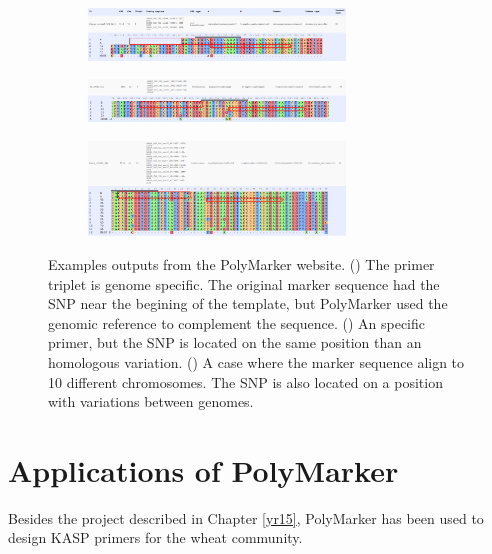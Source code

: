 \begin{figure}
\centering
\begin{subfigure}{1\textwidth}
\caption{}
\label{fig:poly:non-hom-sp}
\includegraphics[width=0.75\textwidth]{PolyMarker/Figures/website/non-hom-sp.png}
\end{subfigure}
\begin{subfigure}{1\textwidth}
\caption{}
\label{fig:poly:hom-sp}
\includegraphics[width=0.75\textwidth]{PolyMarker/Figures/website/hom-sp.png}
\end{subfigure}
\begin{subfigure}{1\textwidth}
\caption{}
\label{fig:poly:hom-multi}
\includegraphics[width=0.75\textwidth]{PolyMarker/Figures/website/hom-multi.png}
\end{subfigure}
\caption[Examples outputs from the PolyMarker website.]{Examples outputs from the PolyMarker website. () The primer triplet is genome specific. The original marker sequence had the SNP near the begining of the template, but PolyMarker used the genomic reference to complement the sequence. () An specific primer, but the SNP is located on the same position than an homologous variation. () A case where the marker sequence align to 10 different chromosomes. The SNP is also located on a position with variations between genomes.}
\label{fig:poly:website}
\end{figure}


\section{Applications of PolyMarker}
Besides the project described in Chapter \ref{yr15}, PolyMarker has been used to design KASP primers for the wheat community.


